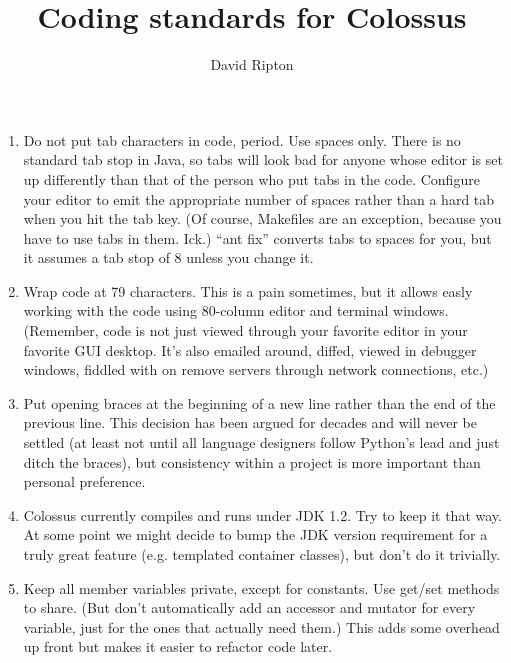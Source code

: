 \documentclass{article}
\begin{document}

\title{Coding standards for Colossus}

\author{David Ripton}

\maketitle

\begin{enumerate}

\item Do not put tab characters in code, period. Use spaces only.
There is no standard tab stop in Java, so tabs will look bad for
anyone whose editor is set up differently than that of the person
who put tabs in the code. Configure your editor to emit the
appropriate number of spaces rather than a hard tab when you hit
the tab key. (Of course, Makefiles are an exception, because
you have to use tabs in them. Ick.) ``ant fix'' converts tabs
to spaces for you, but it assumes a tab stop of 8 unless you
change it.

\item Wrap code at 79 characters. This is a pain sometimes, but it
allows easly working with the code using 80-column editor and
terminal windows. (Remember, code is not just viewed through
your favorite editor in your favorite GUI desktop. It's also
emailed around, diffed, viewed in debugger windows, fiddled with
on remove servers through network connections, etc.)

\item Put opening braces at the beginning of a new line rather than
the end of the previous line. This decision has been argued for
decades and will never be settled (at least not until all language
designers follow Python's lead and just ditch the braces), but
consistency within a project is more important than personal
preference.

\item Colossus currently compiles and runs under JDK 1.2. Try to
keep it that way. At some point we might decide to bump the JDK
version requirement for a truly great feature (e.g. templated
container classes), but don't do it trivially. 

\item Keep all member variables private, except for constants.
Use get/set methods to share. (But don't automatically add 
an accessor and mutator for every variable, just for the ones 
that actually need them.) This adds some overhead up front 
but makes it easier to refactor code later.


\end{enumerate}
\end{document}
